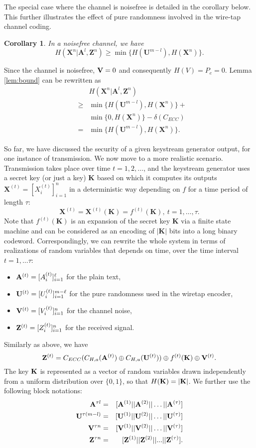 \documentclass{article}[11pt]
\newcommand{\am}{\mathbf{A}}
\newcommand{\km}{\mathbf{K}}
\newcommand{\um}{\mathbf{U}}
\newcommand{\xm}{\mathbf{X}}
\newcommand{\zm}{\mathbf{Z}}
\newtheorem{cor}{Corollary}
\newenvironment{proof}{\noindent {\bf Proof. \ }}{\hfill \vrule height 2pt depth 4pt width 6pt\par\noindent}
\begin{document}
The special case where the channel is noisefree is detailed in the
corollary below. This further illustrates the effect of pure randomness
involved in the wire-tap channel coding.
\begin{cor}
In a noisefree channel, we have
\[
H(\xm^n|\am^l,\zm^n) \geq   \min\{H(\um^{m-l}), H(\xm^n)\}.
\]
\end{cor}
\begin{proof}
Since the channel is noisefree, ${\bf V} = 0$ and consequently $H(V)=P_e =0$.
Lemma \ref{lem:bound} can be rewritten as
\begin{eqnarray*}
& & H(\xm^n|\am^l,\zm^n) \\
&\geq & \min\{H(\um^{m-l}), H(\xm^n)\} +\\
&     & \min\{0,H(\xm^n) \}- \delta(C_{ECC})\\
& = & \min\{H(\um^{m-l}), H(\xm^n)\}.
\end{eqnarray*}
\end{proof}

So far, we have discussed the security of a given keystream
generator output, for one instance of transmission. We now move to
a more realistic scenario. Transmission takes place over time
$t=1,2,\ldots$, and the keystream generator uses a secret key (or
just a key) $\km$ based on which it computes its outputs
$\xm^{(t)}=[X_i^{(t)}]_{i=1}^n$ in a deterministic way depending
on $f$ for a time period of length $\tau$:
\[
\xm^{(t)}=\xm^{(t)}(\km)=f^{(t)}(\km),~t=1,\ldots,\tau.
\]
Note that $f^{(t)}(\km)$ is an expansion of the secret key $\km$ via a finite
state machine and can be considered as an encoding of $|\km|$ bits into a long
binary codeword.
Correspondingly, we can rewrite the whole system in terms of realizations
of random variables that depends on time, over the time interval
$t=1,\ldots\tau$:
\begin{itemize}
\item
 ${\bf A}^{(t)} = [A_i^{(t)}]_{i=1}^{\ell}$ for the plain text,
\item
${\bf U}^{(t)} =[U_i^{(t)}]_{i=1}^{m-\ell}$ for the pure randomness used
in the wiretap encoder,
\item
${\bf V}^{(t)}=[V_i^{(t)}]_{i=1}^n$ for the channel noise,
\item
${\bf Z}^{(t)} = [Z_i^{(t)}]_{i=1}^n$ for the received signal.
\end{itemize}
Similarly as above, we have
\[
{\bf Z}^{(t)} = C_{ECC} (C_{H,a}({\bf A}^{(t)}) \oplus
C_{H,u}({\bf U}^{(t)})) \oplus f^{(t)}({\bf K}) \oplus {\bf
V}^{(t)}.
\]
The key ${\bf K}$ is represented as a vector of random variables drawn
independently from a uniform distribution over $\{0,1\}$, so that
$H(\km) = |{\bf K}|$.
We further use the following block notations:
\begin{eqnarray*}
{\bf A}^{\tau l}& = &[{\bf A}^{(1)}|| {\bf A}^{(2)}||\ldots ||{\bf A}^{(\tau)}]\\
{\bf U}^{\tau (m-l)}&=&[{\bf U}^{(1)}||{\bf U}^{(2)}||\ldots||{\bf U}^{(\tau)}]\\
{\bf V}^{\tau n}& = &[{\bf V}^{(1)}|| {\bf V}^{(2)}||\ldots|| {\bf V}^{(\tau)}]\\
{\bf Z}^{\tau n}& = & [{\bf Z}^{(1)}|| {\bf Z}^{(2)}|| ... || {\bf Z}^{(\tau)}].
\end{eqnarray*}
\end{document}
